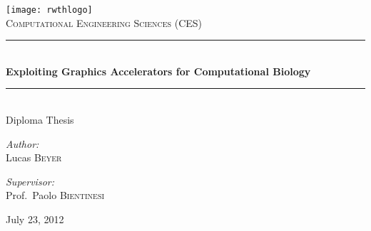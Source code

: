 
\begin{titlepage}

\begin{center}

\texttt{[image: rwthlogo]}\\[1cm]


\textsc{\Large Computational Engineering Sciences (CES)}\\[0.5cm]

{\rule{\linewidth}{0.5mm}} \\[0.4cm]
{\huge \bfseries Exploiting Graphics Accelerators for Computational Biology}\\[0.4cm]

{\rule{\linewidth}{0.5mm}}
\\[0.4cm]
{\Large Diploma Thesis}\\[1.5cm]

\begin{minipage}{0.4\textwidth}
\begin{flushleft} \large
\emph{Author:}\\
Lucas \textsc{Beyer}
\end{flushleft}
\end{minipage}
\begin{minipage}{0.4\textwidth}
\begin{flushright} \large
\emph{Supervisor:} \\
Prof.~Paolo \textsc{Bientinesi}
\end{flushright}
\end{minipage}

\vfill

{\large July 23, 2012}

\end{center}

\end{titlepage}
